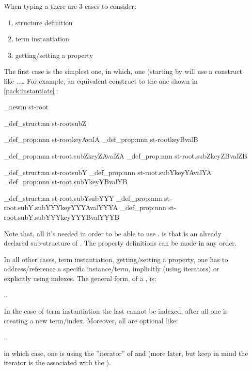 \documentclass[10pt]{article}
\begin{document}
When typing a  there are 3 cases to consider:
\begin{enumerate}[miditemsep]
  \item structure definition
  \item term instantiation
  \item getting/setting a property 
\end{enumerate}

The first case is the simplest one, in which, one (starting by  will use a construct like ..\ldots 
For example, an equivalent construct to the one shown in \ref{pack:instantiate} :

\begin{codestore}[store-env=demo3]
\starray_new:n {st-root}

\starray_def_struct:nn {st-root}{subZ}

\starray_def_prop:nnn {st-root}{keyA}{valA}
\starray_def_prop:nnn {st-root}{keyB}{valB}

\starray_def_prop:nnn {st-root.subZ}{keyZA}{valZA}
\starray_def_prop:nnn {st-root.subZ}{keyZB}{valZB}

\starray_def_struct:nn {st-root}{subY}
\starray_def_prop:nnn {st-root.subY}{keyYA}{valYA}
\starray_def_prop:nnn {st-root.subY}{keyYB}{valYB}

\starray_def_struct:nn {st-root.subY}{subYYY}
\starray_def_prop:nnn {st-root.subY.subYYY}{keyYYYA}{valYYYA}
\starray_def_prop:nnn {st-root.subY.subYYY}{keyYYYB}{valYYYB}
  
\end{codestore}


Note that, all it's needed in order to be able to use . is that  is an already declared sub-structure of . The property definitions can be made in any order.

In all other cases, term instantiation, getting/setting a property, one has to address/reference a specific instance/term, implicitly (using iterators) or explicitly using indexes.
The general form, of a , is: \par
{}.. \par
In the case of term instantiation the last  cannot be indexed, after all one is creating a new term/index. Moreover, all  are optional like:\par
{}.. \par
in which case, one is using the ''iterator'' of  and  (more later, but keep in mind the  iterator is the  associated with the ).
\end{document}
